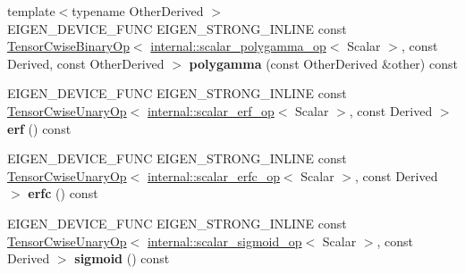 \begin{DoxyCompactItemize}
{\footnotesize template$<$typename Other\+Derived $>$ }\\E\+I\+G\+E\+N\+\_\+\+D\+E\+V\+I\+C\+E\+\_\+\+F\+U\+NC E\+I\+G\+E\+N\+\_\+\+S\+T\+R\+O\+N\+G\+\_\+\+I\+N\+L\+I\+NE const \hyperlink{class_eigen_1_1_tensor_cwise_binary_op}{Tensor\+Cwise\+Binary\+Op}$<$ \hyperlink{struct_eigen_1_1internal_1_1scalar__polygamma__op}{internal\+::scalar\+\_\+polygamma\+\_\+op}$<$ Scalar $>$, const Derived, const Other\+Derived $>$ {\bfseries polygamma} (const Other\+Derived \&other) const
\item 
\mbox{\label{class_eigen_1_1_tensor_base_3_01_derived_00_01_read_only_accessors_01_4_a761cf3a8c95faa71a427b0439ef23a28}} 
E\+I\+G\+E\+N\+\_\+\+D\+E\+V\+I\+C\+E\+\_\+\+F\+U\+NC E\+I\+G\+E\+N\+\_\+\+S\+T\+R\+O\+N\+G\+\_\+\+I\+N\+L\+I\+NE const \hyperlink{class_eigen_1_1_tensor_cwise_unary_op}{Tensor\+Cwise\+Unary\+Op}$<$ \hyperlink{struct_eigen_1_1internal_1_1scalar__erf__op}{internal\+::scalar\+\_\+erf\+\_\+op}$<$ Scalar $>$, const Derived $>$ {\bfseries erf} () const
\item 
\mbox{\label{class_eigen_1_1_tensor_base_3_01_derived_00_01_read_only_accessors_01_4_ac4b11964390999d78b493dac3981b7a4}} 
E\+I\+G\+E\+N\+\_\+\+D\+E\+V\+I\+C\+E\+\_\+\+F\+U\+NC E\+I\+G\+E\+N\+\_\+\+S\+T\+R\+O\+N\+G\+\_\+\+I\+N\+L\+I\+NE const \hyperlink{class_eigen_1_1_tensor_cwise_unary_op}{Tensor\+Cwise\+Unary\+Op}$<$ \hyperlink{struct_eigen_1_1internal_1_1scalar__erfc__op}{internal\+::scalar\+\_\+erfc\+\_\+op}$<$ Scalar $>$, const Derived $>$ {\bfseries erfc} () const
\item 
\mbox{\label{class_eigen_1_1_tensor_base_3_01_derived_00_01_read_only_accessors_01_4_a9993754df6295789e8e40dca88c8d37d}} 
E\+I\+G\+E\+N\+\_\+\+D\+E\+V\+I\+C\+E\+\_\+\+F\+U\+NC E\+I\+G\+E\+N\+\_\+\+S\+T\+R\+O\+N\+G\+\_\+\+I\+N\+L\+I\+NE const \hyperlink{class_eigen_1_1_tensor_cwise_unary_op}{Tensor\+Cwise\+Unary\+Op}$<$ \hyperlink{struct_eigen_1_1internal_1_1scalar__sigmoid__op}{internal\+::scalar\+\_\+sigmoid\+\_\+op}$<$ Scalar $>$, const Derived $>$ {\bfseries sigmoid} () const
\item 
\mbox{\label{class_eigen_1_1_tensor_base_3_01_derived_00_01_read_only_accessors_01_4_a7417739343a8a31b6fe71b22a4cd72a8}} 

\end{DoxyCompactItemize}
